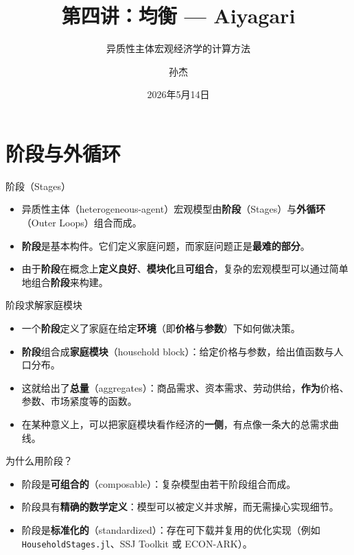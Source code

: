 \documentclass[10pt,aspectratio=169]{beamer}
\title{第四讲：均衡 --- Aiyagari}
\subtitle{异质性主体宏观经济学的计算方法}
\author{孙杰}
\institute{多伦多大学}
\date{2026年5月14日}
\begin{document}
\maketitle

\section{阶段与外循环}

\begin{frame}{阶段（Stages）}
  \begin{itemize}
    \item 异质性主体（heterogeneous-agent）宏观模型由\textbf{阶段}（Stages）与\textbf{外循环}（Outer Loops）组合而成。
    \item \textbf{阶段}是基本构件。它们定义家庭问题，而家庭问题正是\textbf{最难的部分}。
    \item 由于\textbf{阶段}在概念上\textbf{定义良好}、\textbf{模块化}且\textbf{可组合}，复杂的宏观模型可以通过简单地组合\textbf{阶段}来构建。
  \end{itemize}
\end{frame}

\begin{frame}{阶段求解家庭模块}
  \begin{itemize}
    \item 一个\textbf{阶段}定义了家庭在给定\textbf{环境}（即\textbf{价格}与\textbf{参数}）下如何做决策。
    \item \textbf{阶段}组合成\textbf{家庭模块}（household block）：给定价格与参数，给出值函数与人口分布。
    \item 这就给出了\textbf{总量}（aggregates）：商品需求、资本需求、劳动供给，\textbf{作为}价格、参数、市场紧度等的函数。
    \item 在某种意义上，可以把家庭模块看作经济的\textbf{一侧}，有点像一条大的总需求曲线。
  \end{itemize}
\end{frame}

\begin{frame}{为什么用阶段？}
  \begin{itemize}
    \item 阶段是\textbf{可组合的}（composable）：复杂模型由若干阶段组合而成。
    \item 阶段具有\textbf{精确的数学定义}：模型可以被定义并求解，而无需操心实现细节。
    \item 阶段是\textbf{标准化的}（standardized）：存在可下载并复用的优化实现（例如 \texttt{HouseholdStages.jl}、SSJ Toolkit 或 ECON-ARK）。
  \end{itemize}

\end{frame}
\end{document}
